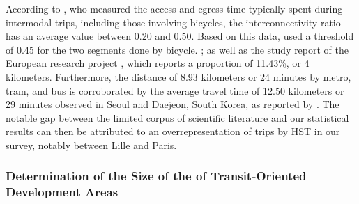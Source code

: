 \begin{refsegment}
{    According to \textcolor{blue}{\textcite[274]{krygsman_multimodal_2004}}, who measured the access and egress time typically spent during intermodal trips, including those involving bicycles, the interconnectivity ratio has an average value between 0.20 and 0.50. Based on this data, \textcolor{blue}{\textcite[116]{nigro_land_2019}} used a threshold of 0.45 for the two segments done by bicycle.
}; as well as the study report of the European research project \textcolor{blue}{\textcite[20 ; 28]{bitibi_bike_2017}}, which reports a proportion of 11.43\%, or 4 kilometers. Furthermore, the distance of 8.93 kilometers or 24 minutes by metro, tram, and bus is corroborated by the average travel time of 12.50 kilometers or 29 minutes observed in Seoul and Daejeon, South Korea, as reported by \textcolor{blue}{\textcite[46]{lee_strategies_2010}}. The notable gap between the limited corpus of scientific literature and our statistical results can then be attributed to an overrepresentation of trips by \acrshort{HST} in our survey, notably between Lille and Paris.%

\subsubsection*{Determination of the Size of the  of Transit-Oriented Development Areas
    \label{chap5:taille-aire-secondaire}
    }


\end{refsegment}
